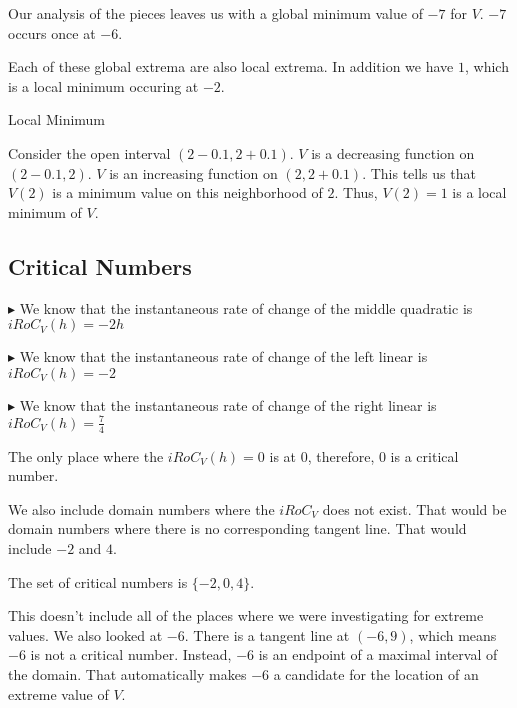 \documentclass{ximera}
\begin{document}
Our analysis of the pieces leaves us with a global minimum value of $-7$ for $V$. $-7$ occurs once at $-6$.



Each of these global extrema are also local extrema.  In addition we have $1$, which is a local minimum occuring at $-2$.  

\begin{explanation} Local Minimum


Consider the open interval $(2 - 0.1, 2 + 0.1)$. $V$ is a decreasing function on $(2 - 0.1, 2)$. $V$ is an increasing function on $(2, 2 + 0.1)$.  This tells us that $V(2)$ is a minimum value on this neighborhood of $2$.  Thus, $V(2)=1$ is a local minimum of $V$.





\end{explanation}









\subsection{Critical Numbers} 


$\blacktriangleright$ We know that the instantaneous rate of change of the middle quadratic is $iRoC_V(h) = -2h$ 

$\blacktriangleright$ We know that the instantaneous rate of change of the left linear is $iRoC_V(h) = -2$

$\blacktriangleright$ We know that the instantaneous rate of change of the right linear is $iRoC_V(h) = \frac{7}{4}$



The only place where the $iRoC_V(h) = 0$ is at $0$, therefore, $0$ is a critical number.


We also include domain numbers where the $iRoC_V$ does not exist.  That would be domain numbers where there is no corresponding tangent line.  That would include $-2$ and $4$.



The set of critical numbers is $\{ -2, 0, 4 \}$.




This doesn't include all of the places where we were investigating for extreme values. We also looked at $-6$.  There is a tangent line at $(-6, 9)$, which means $-6$ is not a critical number. Instead, $-6$ is an endpoint of a maximal interval of the domain. That automatically makes $-6$ a candidate for the location of an extreme value of $V$.
\end{document}
